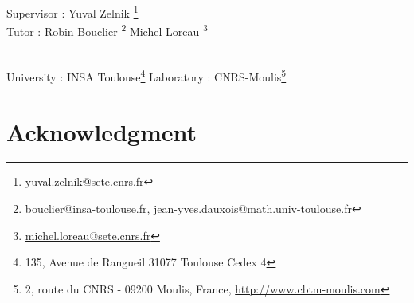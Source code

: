 \documentclass{article}
\begin{document}
\begin{titlepage}

\vspace*{3cm}

\begin{flushleft}
\hfill 
Supervisor : Yuval Zelnik \footnote{\url{yuval.zelnik@sete.cnrs.fr}} \\
Tutor : Robin Bouclier \footnote{\url{bouclier@insa-toulouse.fr}, \url{jean-yves.dauxois@math.univ-toulouse.fr}}  \hfill 
Michel Loreau \footnote{\url{michel.loreau@sete.cnrs.fr}}

 \\
University : INSA Toulouse\footnote{135, Avenue de Rangueil 31077 Toulouse Cedex 4} \hfill
Laboratory : CNRS-Moulis\footnote{2, route du CNRS - 09200 Moulis, France, \url{http://www.cbtm-moulis.com}} \\
\end{flushleft}

\end{titlepage}



\newpage
\addto\captionsfrench{\def\contentsname{}} %

\paragraph{}


\tableofcontents



\newpage
\listoffigures


\newpage
\section*{Acknowledgment}
\end{document}
